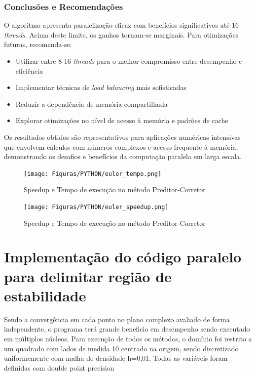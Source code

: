 \documentclass[a4paper,12pt]{article}
\begin{document}
\subsubsection*{Conclusões e Recomendações}
O algoritmo apresenta paralelização eficaz com benefícios significativos até 16 \textit{threads}. Acima deste limite, os ganhos tornam-se marginais. Para otimizações futuras, recomenda-se:

\begin{itemize}
	\item Utilizar entre 8-16 \textit{threads} para o melhor compromisso entre desempenho e eficiência
	\item Implementar técnicas de \textit{load balancing} mais sofisticadas
	\item Reduzir a dependência de memória compartilhada
	\item Explorar otimizações no nível de acesso à memória e padrões de cache
\end{itemize}

Os resultados obtidos são representativos para aplicações numéricas intensivas que envolvem cálculos com números complexos e acesso frequente à memória, demonstrando os desafios e benefícios da computação paralela em larga escala.

\begin{figure}[H]
	\centering
	\texttt{[image: Figuras/PYTHON/euler\_tempo.png]}
	\caption{Speedup e Tempo de execução no método Preditor-Corretor}
	\label{fig:speed_threads_PC4_euler}
\end{figure}


\begin{figure}[H]
	\centering
	\texttt{[image: Figuras/PYTHON/euler\_speedup.png]}
	\caption{Speedup e Tempo de execução no método Preditor-Corretor}
	\label{fig:speedup_threads_PC4_euler}
\end{figure}

\section{Implementação do código paralelo para delimitar região de estabilidade}
Sendo a convergência em cada ponto no plano complexo avaliado de forma independente, o programa terá grande beneficio em desempenho sendo executado em múltiplos núcleos.
Para execução de todos os métodos, o domínio foi restrito a um quadrado com lados de medida 10 centrado na origem, sendo discretizado uniformemente com malha de densidade h=0,01. 
Todas as variáveis foram definidas com double point precision  
\end{document}
